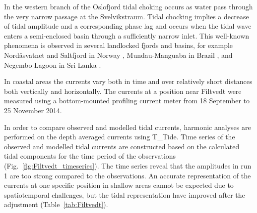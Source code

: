 In the western branch of the Oslofjord tidal choking occurs as water pass through the very narrow passage at the Svelvikstraum. Tidal chocking implies a decrease of tidal amplitude and a corresponding phase lag \cite[]{stigebrandt80} and occurs when the tidal wave enters a semi-enclosed basin through a sufficiently narrow inlet. This well-known phenomena is observed in several landlocked fjords and basins, for example Nord{\aa}svatnet and Saltfjord in Norway \cite[]{glenne63,eliassen01}, Mundau-Manguaba in Brazil \cite[]{oliveira93}, and Negembo Lagoon in Sri Lanka \cite[]{rydberg96}. 


In coastal areas the currents vary both in time and over relatively short distances both vertically and horizontally. The currents at a position near Filtvedt were measured using a bottom-mounted profiling current meter from 18 September to 25 November 2014.  

In order to compare observed and modelled tidal currents, harmonic analyses are performed on the depth averaged currents using T\_Tide. Time series of the observed and modelled tidal currents are constructed based on the calculated tidal components for the time period of the observations (Fig.~\ref{fig:Filtvedt_timeseries}). The time series reveal that the amplitudes in run 1 are too strong compared to the observations. 
An accurate representation of the currents at one specific position in shallow areas cannot be expected due to spatiotemporal challenges, but the tidal representation have improved after the adjustment (Table~\ref{tab:Filtvedt}). %

